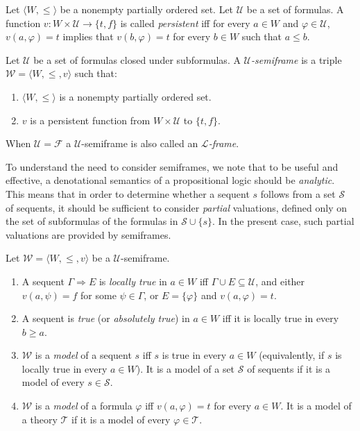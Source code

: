 \documentclass{LMCS}
\theoremstyle{remark}
\newcommand{\lp}{\mathcal{L}}
\newcommand{\Ss}{\mathcal{S}}
\newcommand{\T}{\mathcal{T}}
\newcommand{\U}{\mathcal{U}}
\newcommand{\W}{\mathcal{W}}
\newcommand{\F}{\mathcal{F}}
\newcommand{\be}{\begin{enumerate}[(1)]}
\newcommand{\ee}{\end{enumerate}}
\newcommand{\Ra}{\Rightarrow}
\newcommand{\g}{\Gamma}
\newcommand{\tup}[1]{\langle #1 \rangle}
\newcommand{\fe}{\varphi}
\newcommand{\suq}{\subseteq}
\begin{document}
\begin{defi}
\label{persistent}
Let $\tup{W,\leq}$ be a nonempty partially ordered set.
Let $\U$ be a set of formulas.
A function $v:W \times \U\to \{t,f\}$ is called {\em persistent}
iff for every $a\in W$ and $\fe \in \U$,
 $v(a,\fe)=t$ implies that $v(b,\fe)=t$ for every $b\in W$
such that $a \leq b$.
\end{defi}

\begin{defi}
\label{semiframe}
Let $\U$ be a set of formulas closed under subformulas.
A {\em $\U$-semiframe} is a triple $\W=\tup{W, \leq,v}$
such that:
\be
\item $\tup{W,\leq}$ is a nonempty partially ordered set.
\item $v$ is a persistent function from $W \times {\U}$ to $\{t,f\}$.
\ee
When $\U=\F$ a $\U$-semiframe is also called an 
{\em $\lp$-frame}.\end{defi}

\begin{rem}
\label{analytic remark}
To understand the need to consider semiframes, we note that 
to be useful and effective, a denotational semantics of 
a propositional logic should be {\em analytic}. 
This means that in order to determine
whether a sequent $s$ follows from a set  $\Ss$ of sequents,
it should be sufficient to consider {\em partial} valuations,
defined only on the set of subformulas of the formulas in
${\Ss}\cup\{s\}$. In the present case, such partial valuations are 
provided by semiframes.
\end{rem}

\begin{defi}
\label{sequent-satisfaction} 
Let ${\W=\tup{W, \leq,v}}$ be a $\U$-semiframe.
\be
\item A sequent ${\g\Ra E}$ is {\em locally true} in $a\in W$ 
iff $\g\cup E\suq\U$, and either ${v(a,\psi)=f}$ for some ${\psi\in\g}$, or 
$E=\{\fe\}$ and ${v(a,\fe)=t}$.
\item A sequent is {\em true} (or {\em absolutely true}) in $a\in W$ iff
it is locally true in every $b\geq a$.
\item ${\W}$ is a {\em model} of a sequent $s$ 
iff $s$ is true in every $a\in W$ (equivalently, if $s$ is locally true in every $a\in W$). 
It is a model of a set $\Ss$ of sequents if it is a model of every $s\in{\Ss}$.
\item ${\W}$ is a {\em model} of a formula $\fe$ iff $v(a,\fe)=t$ for every $a\in W$. 
It is a model of a theory $\T$ if it is a model of every $\fe\in\T$.
\ee
\end{defi}
\end{document}

